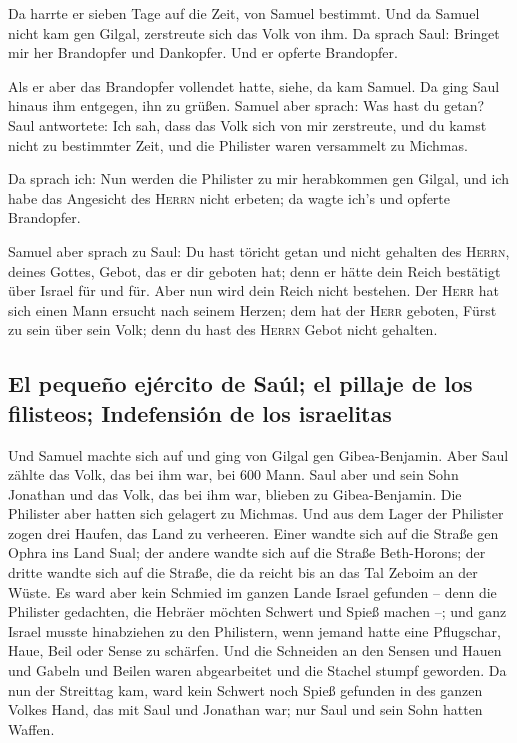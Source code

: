  Da harrte er sieben Tage auf die Zeit, von Samuel
bestimmt. Und da Samuel nicht kam gen Gilgal, zerstreute sich das Volk
von ihm.  Da sprach Saul: Bringet mir her Brandopfer und
Dankopfer. Und er opferte Brandopfer.

 Als er aber das Brandopfer vollendet hatte, siehe, da
kam Samuel. Da ging Saul hinaus ihm entgegen, ihn zu grüßen.
 Samuel aber sprach: Was hast du getan? Saul antwortete:
Ich sah, dass das Volk sich von mir zerstreute, und du kamst nicht zu
bestimmter Zeit, und die Philister waren versammelt zu Michmas.

 Da sprach ich: Nun werden die Philister zu mir
herabkommen gen Gilgal, und ich habe das Angesicht des \textsc{Herrn}
nicht erbeten; da wagte ich's und opferte Brandopfer.

 Samuel aber sprach zu Saul: Du hast töricht getan und
nicht gehalten des \textsc{Herrn}, deines Gottes, Gebot, das er dir
geboten hat; denn er hätte dein Reich bestätigt über Israel für und für.
 Aber nun wird dein Reich nicht bestehen. Der
\textsc{Herr} hat sich einen Mann ersucht nach seinem Herzen; dem hat
der \textsc{Herr} geboten, Fürst zu sein über sein Volk; denn du hast
des \textsc{Herrn} Gebot nicht gehalten.

\hypertarget{el-pequeuxf1o-ejuxe9rcito-de-sauxfal-el-pillaje-de-los-filisteos-indefensiuxf3n-de-los-israelitas}{%
\subsection{El pequeño ejército de Saúl; el pillaje de los filisteos;
Indefensión de los
israelitas}\label{el-pequeuxf1o-ejuxe9rcito-de-sauxfal-el-pillaje-de-los-filisteos-indefensiuxf3n-de-los-israelitas}}

 Und Samuel machte sich auf und ging von Gilgal gen
Gibea-Benjamin. Aber Saul zählte das Volk, das bei ihm war, bei 600
Mann.  Saul aber und sein Sohn Jonathan und das Volk, das
bei ihm war, blieben zu Gibea-Benjamin. Die Philister aber hatten sich
gelagert zu Michmas.  Und aus dem Lager der Philister
zogen drei Haufen, das Land zu verheeren. Einer wandte sich auf die
Straße gen Ophra ins Land Sual;  der andere wandte sich
auf die Straße Beth-Horons; der dritte wandte sich auf die Straße, die
da reicht bis an das Tal Zeboim an der Wüste.  Es ward
aber kein Schmied im ganzen Lande Israel gefunden -- denn die Philister
gedachten, die Hebräer möchten Schwert und Spieß machen --;
 und ganz Israel musste hinabziehen zu den Philistern,
wenn jemand hatte eine Pflugschar, Haue, Beil oder Sense zu schärfen.
 Und die Schneiden an den Sensen und Hauen und Gabeln und
Beilen waren abgearbeitet und die Stachel stumpf geworden.
 Da nun der Streittag kam, ward kein Schwert noch Spieß
gefunden in des ganzen Volkes Hand, das mit Saul und Jonathan war; nur
Saul und sein Sohn hatten Waffen.

